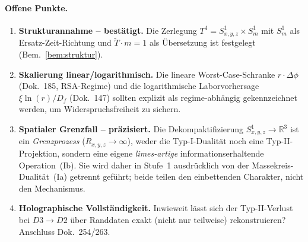 \paragraph{Offene Punkte.}
\begin{enumerate}
  \item \textbf{Strukturannahme -- best\"atigt.} Die Zerlegung
  $T^4 = S^1_{x,y,z}\times S^1_m$ mit $S^1_m$ als Ersatz-Zeit-Richtung und
  $\tilde{T}\cdot m = 1$ als \"Ubersetzung ist festgelegt
  (Bem.~\ref{bem:struktur}).
  \item \textbf{Skalierung linear/logarithmisch.} Die lineare Worst-Case-Schranke
  $r\cdot\Delta\phi$ (Dok.~185, RSA-Regime) und die logarithmische
  Laborvorhersage $\xi\ln(r)/D_f$ (Dok.~147) sollten explizit als
  regime-abh\"angig gekennzeichnet werden, um Widerspruchsfreiheit zu sichern.
  \item \textbf{Spatialer Grenzfall -- pr\"azisiert.} Die Dekompaktifizierung
  $S^1_{x,y,z}\to\mathbb{R}^3$ ist ein \emph{Grenzprozess} ($R_{x,y,z}\to\infty$),
  weder die Typ-I-Dualit\"at noch eine Typ-II-Projektion, sondern eine eigene
  \emph{limes-artige} informationserhaltende Operation~(Ib). Sie wird daher in
  Stufe~1 ausdr\"ucklich von der Massekreis-Dualit\"at~(Ia) getrennt gef\"uhrt;
  beide teilen den einbettenden Charakter, nicht den Mechanismus.
  \item \textbf{Holographische Vollst\"andigkeit.} Inwieweit l\"asst sich der
  Typ-II-Verlust bei $D3\to D2$ \"uber Randdaten exakt (nicht nur teilweise)
  rekonstruieren? Anschluss Dok.~254/263.
\end{enumerate}
